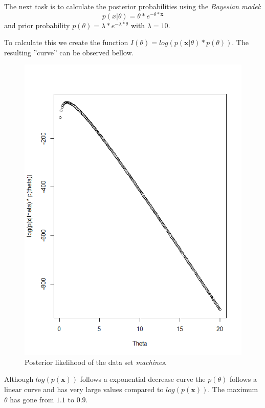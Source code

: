 \documentclass[a4paper,12pt]{article}
\begin{document}
The next task is to calculate the posterior probabilities using the \textit{Bayesian model}: 
\begin{equation}
  p(x|\theta) = \theta * e^{-\theta * \mathbf{x}}
\end{equation}
and prior probability \(p(\theta) = \lambda * e^{-\lambda*\theta} \) with \( \lambda = 10\).  

To calculate this we create the function \(I(\theta) = log(p(\textbf{x}|\theta) * p(\theta))\).  The resulting ''curve'' can be observed bellow.
\begin{figure}[H]
\centering
\begin{minipage}[]{0.5\textwidth}
  \includegraphics[width=\textwidth]{figures/Lab1_A2_post.png}  
  \caption{Posterior likelihood of the data set \textit{machines}.\label{fig:Postpriori likelihood of the data set machines} }
 \end{minipage}
\end{figure}
Although \( log(p(\mathbf{x}))\) follows a exponential decrease curve the \(p(\theta)\) follows a linear curve and has very large values compared to \( log(p(\mathbf{x}))\). The maximum \(\theta\) has gone from \(1.1\) to \(0.9\).
\end{document}
